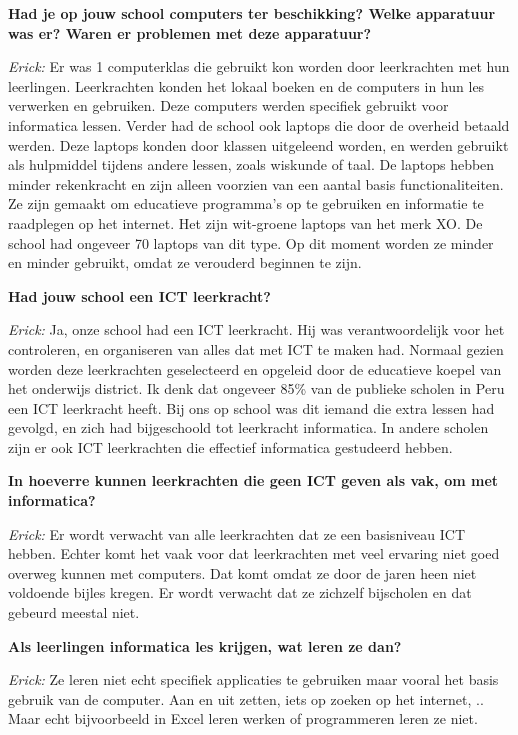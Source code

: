 \textbf{Had je op jouw school computers ter beschikking? Welke apparatuur was er? Waren er problemen met deze apparatuur?}

\textit{Erick:} Er was 1 computerklas die gebruikt kon worden door leerkrachten met hun leerlingen. Leerkrachten konden het lokaal boeken en de computers in hun les verwerken en gebruiken. Deze computers werden specifiek gebruikt voor informatica lessen. Verder had de school ook laptops die door de overheid betaald werden. Deze laptops konden door klassen uitgeleend worden, en werden gebruikt als hulpmiddel tijdens andere lessen, zoals wiskunde of taal. De laptops hebben minder rekenkracht en zijn alleen voorzien van een aantal basis functionaliteiten. Ze zijn gemaakt om educatieve programma's op te gebruiken en informatie te raadplegen op het internet. Het zijn wit-groene laptops van het merk XO. De school had ongeveer 70 laptops van dit type. Op dit moment worden ze minder en minder gebruikt, omdat ze verouderd beginnen te zijn.

\textbf{Had jouw school een ICT leerkracht?}

\textit{Erick:} Ja, onze school had een ICT leerkracht. Hij was verantwoordelijk voor het controleren, en organiseren van alles dat met ICT te maken had. Normaal gezien worden deze leerkrachten geselecteerd en opgeleid door de educatieve koepel van het onderwijs district. Ik denk dat ongeveer 85\% van de publieke scholen in Peru een ICT leerkracht heeft. Bij ons op school was dit iemand die extra lessen had gevolgd, en zich had bijgeschoold tot leerkracht informatica. In andere scholen zijn er ook ICT leerkrachten die effectief informatica gestudeerd hebben.

\textbf{In hoeverre kunnen leerkrachten die geen ICT geven als vak, om met informatica?}

\textit{Erick:} Er wordt verwacht van alle leerkrachten dat ze een basisniveau ICT hebben. Echter komt het vaak voor dat leerkrachten met veel ervaring niet goed overweg kunnen met computers. Dat komt omdat ze door de jaren heen niet voldoende bijles kregen. Er wordt verwacht dat ze zichzelf bijscholen en dat gebeurd meestal niet.

\textbf{Als leerlingen informatica les krijgen, wat leren ze dan?}

\textit{Erick:} Ze leren niet echt specifiek applicaties te gebruiken maar vooral het basis gebruik van de computer. Aan en uit zetten, iets op zoeken op het internet, .. Maar echt bijvoorbeeld in Excel leren werken of programmeren leren ze niet.

